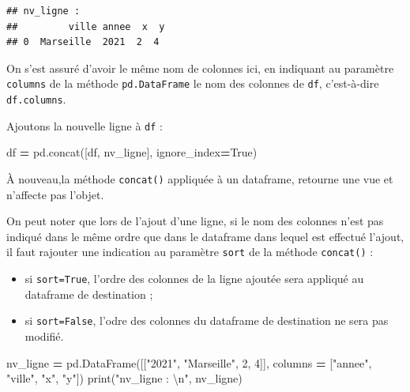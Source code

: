 \documentclass[
  12pt,
]{book}
\newenvironment{Shaded}{\begin{snugshade}}{\end{snugshade}}
\newcommand{\BuiltInTok}[1]{#1}
\newcommand{\CharTok}[1]{\textcolor[rgb]{0.31,0.60,0.02}{#1}}
\newcommand{\DecValTok}[1]{\textcolor[rgb]{0.00,0.00,0.81}{#1}}
\newcommand{\NormalTok}[1]{#1}
\newcommand{\OperatorTok}[1]{\textcolor[rgb]{0.81,0.36,0.00}{\textbf{#1}}}
\newcommand{\StringTok}[1]{\textcolor[rgb]{0.31,0.60,0.02}{#1}}
\newcommand{\VariableTok}[1]{\textcolor[rgb]{0.00,0.00,0.00}{#1}}
\providecommand{\tightlist}{%
  \setlength{\itemsep}{0pt}\setlength{\parskip}{0pt}}
\numberwithin{equation}{section}
\numberwithin{countremarque}{section}
\begin{document}
\begin{lstlisting}
## nv_ligne : 
##         ville annee  x  y
## 0  Marseille  2021  2  4
\end{lstlisting}

On s'est assuré d'avoir le même nom de colonnes ici, en indiquant au paramètre \texttt{columns} de la méthode \texttt{pd.DataFrame} le nom des colonnes de \texttt{df}, c'est-à-dire \texttt{df.columns}.

Ajoutons la nouvelle ligne à \texttt{df} :

\begin{Shaded}
\begin{Highlighting}[]
\NormalTok{df }\OperatorTok{=}\NormalTok{ pd.concat([df, nv\_ligne], ignore\_index}\OperatorTok{=}\VariableTok{True}\NormalTok{)}
\end{Highlighting}
\end{Shaded}

À nouveau,la méthode \texttt{concat()} appliquée à un dataframe, retourne une vue et n'affecte pas l'objet.

On peut noter que lors de l'ajout d'une ligne, si le nom des colonnes n'est pas indiqué dans le même ordre que dans le dataframe dans lequel est effectué l'ajout, il faut rajouter une indication au paramètre \texttt{sort} de la méthode \texttt{concat()} :

\begin{itemize}
\tightlist
\item
  si \texttt{sort=True}, l'ordre des colonnes de la ligne ajoutée sera appliqué au dataframe de destination ;
\item
  si \texttt{sort=False}, l'odre des colonnes du dataframe de destination ne sera pas modifié.
\end{itemize}

\begin{Shaded}
\begin{Highlighting}[]
\NormalTok{nv\_ligne }\OperatorTok{=}\NormalTok{ pd.DataFrame([[}\StringTok{"2021"}\NormalTok{, }\StringTok{"Marseille"}\NormalTok{, }\DecValTok{2}\NormalTok{, }\DecValTok{4}\NormalTok{]],}
\NormalTok{                       columns }\OperatorTok{=}\NormalTok{ [}\StringTok{"annee"}\NormalTok{, }\StringTok{"ville"}\NormalTok{, }\StringTok{"x"}\NormalTok{, }\StringTok{"y"}\NormalTok{])}
\BuiltInTok{print}\NormalTok{(}\StringTok{"nv\_ligne : }\CharTok{\textbackslash{}n}\StringTok{"}\NormalTok{, nv\_ligne)}
\end{Highlighting}
\end{Shaded}
\end{document}
